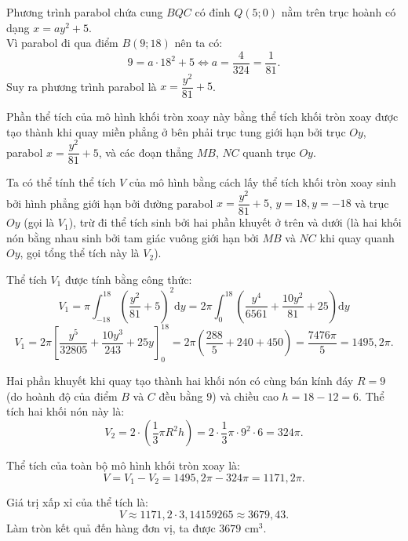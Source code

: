 \begin{ex}
{		Phương trình parabol chứa cung $BQC$ có đỉnh $Q\left( 5; 0 \right)$ nằm trên trục hoành có dạng $x = ay^2 + 5$. \\
		Vì parabol đi qua điểm $B\left( 9; 18 \right)$ nên ta có:
		$$9 = a \cdot 18^2 + 5 \Leftrightarrow a = \dfrac{4}{324} = \dfrac{1}{81}.$$
		Suy ra phương trình parabol là $x = \dfrac{y^2}{81} + 5$.
		
		Phần thể tích của mô hình khối tròn xoay này bằng thể tích khối tròn xoay được tạo thành khi quay miền phẳng ở bên phải trục tung giới hạn bởi trục $Oy$, parabol $x = \dfrac{y^2}{81} + 5$, và các đoạn thẳng $MB$, $NC$ quanh trục $Oy$.
		
		Ta có thể tính thể tích $V$ của mô hình bằng cách lấy thể tích khối tròn xoay sinh bởi hình phẳng giới hạn bởi đường parabol $x = \dfrac{y^2}{81} + 5$, $y = 18, y = -18$ và trục $Oy$ (gọi là $V_1$), trừ đi thể tích sinh bởi hai phần khuyết ở trên và dưới (là hai khối nón bằng nhau sinh bởi tam giác vuông giới hạn bởi $MB$ và $NC$ khi quay quanh $Oy$, gọi tổng thể tích này là $V_2$).
		
		Thể tích $V_1$ được tính bằng công thức:
		$$V_1 = \pi \int_{-18}^{18} \left( \dfrac{y^2}{81} + 5 \right)^2 \mathrm{d}y = 2\pi \int_{0}^{18} \left( \dfrac{y^4}{6561} + \dfrac{10y^2}{81} + 25 \right) \mathrm{d}y$$
		$$V_1 = 2\pi \left[ \dfrac{y^5}{32805} + \dfrac{10y^3}{243} + 25y \right]_{0}^{18} = 2\pi \left( \dfrac{288}{5} + 240 + 450 \right) = \dfrac{7476\pi}{5} = 1495,2\pi.$$
		
		Hai phần khuyết khi quay tạo thành hai khối nón có cùng bán kính đáy $R = 9$ (do hoành độ của điểm $B$ và $C$ đều bằng $9$) và chiều cao $h = 18 - 12 = 6$.
		Thể tích hai khối nón này là:
		$$V_2 = 2 \cdot \left( \dfrac{1}{3} \pi R^2 h \right) = 2 \cdot \dfrac{1}{3} \pi \cdot 9^2 \cdot 6 = 324\pi.$$
		
		Thể tích của toàn bộ mô hình khối tròn xoay là:
		$$V = V_1 - V_2 = 1495,2\pi - 324\pi = 1171,2\pi.$$
		
		Giá trị xấp xỉ của thể tích là:
		$$V \approx 1171,2 \cdot 3,14159265 \approx 3679,43.$$
		Làm tròn kết quả đến hàng đơn vị, ta được $3679$ cm$^3$.
	}
\end{ex}

